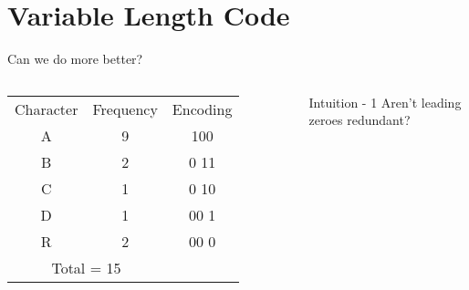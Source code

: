 \section{Variable Length Code}
\begin{frame}{Can we do more better?}
    \begin{columns}
\begin{table}[]
\begin{tabular}{ccc}
\rowcolor[HTML]{009901} 
Character                  & Frequency                 & Encoding \\ 
\rowcolor[HTML]{FE0000} 
A                          & 9                         & 100      \\
\rowcolor[HTML]{F8A102} 
B                          & 2                         & \alert{0} 11      \\
\rowcolor[HTML]{F8FF00} 
C                          & 1                         & \alert{0} 10      \\
\rowcolor[HTML]{FCFF2F} 
D                          & 1                         & \alert{00} 1      \\
\rowcolor[HTML]{FFCC67} 
R                          & 2                         & \alert{00} 0      \\
\multicolumn{2}{c}{\cellcolor[HTML]{FFFFFF}Total = 15} &         
\end{tabular}
\end{table}
    \begin{exampleblock}{\centering Intuition - 1}
    \centering
       Aren't leading zeroes \alert{redundant}?
    \end{exampleblock}
    \end{columns}

\end{frame}
